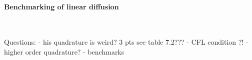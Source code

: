 \paragraph{Benchmarking of linear diffusion}

















\newpage
\begin{center}
\\
\end{center}

Questions:
- his quadrature is weird?  3 pts see table 7.2???
- CFL condition ?!
- higher order quadrature?
- benchmarks
